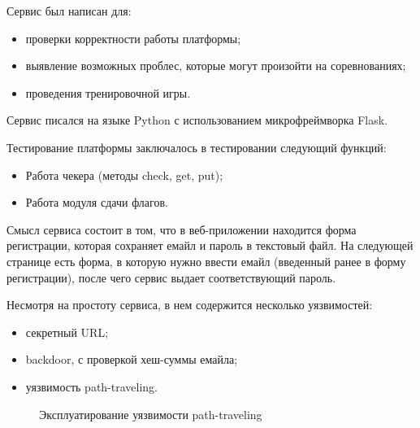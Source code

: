 Сервис был написан для:
\begin{itemize} 
\item проверки корректности работы платформы;
\item выявление возможных проблес, которые могут произойти на соревнованиях;
\item проведения тренировочной игры.
\end{itemize}

Сервис писался на языке Python с использованием микрофреймворка Flask.

Тестирование платформы заключалось в тестировании следующий функций:
\begin{itemize} 
\item Работа чекера (методы check, get, put);
\item Работа модуля сдачи флагов.
\end{itemize}

Смысл сервиса состоит в том, что в веб-приложении находится форма регистрации, которая сохраняет емайл и пароль в текстовый файл. На следующей странице есть форма, в которую нужно ввести емайл (введенный ранее в форму регистрации), после чего сервис выдает соответствующий пароль.

Несмотря на простоту сервиса, в нем содержится несколько уязвимостей:
\begin{itemize} 
\item секретный URL;
\item backdoor, с проверкой хеш-суммы емайла;
\item уязвимость path-traveling.
\end{itemize}

\begin{figure}[ht!]
\caption{Эксплуатирование уязвимости path-traveling}
\end{figure}